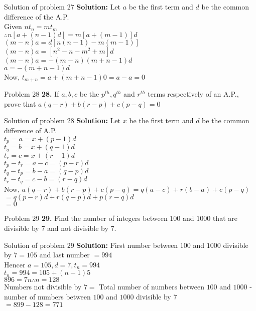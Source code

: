 \documentclass[aspectratio=1610,8pt]{beamer}
\begin{document}
\begin{frame}{Solution of problem 27}
  \textbf{Solution:} Let $a$ be the first term and $d$ be the common difference of the A.P.\\
  Given $nt_n = mt_m$\\
  $\therefore n[a + (n - 1)d] = m[a + (m - 1)]d$\\
  $(m - n)a = d[n(n - 1) - m(m - 1)]$\\
  $(m - n)a = [n^2 - n - m^2 + m]d$\\
  $(m - n)a = -(m - n)(m + n - 1)d$\\
  $a = -(m + n - 1)d$\\
  Now, $t_{m + n} = a + (m + n - 1)0 = a - a = 0$
\end{frame}
\begin{frame}{Problem 28}
  \textbf{28.} If $a, b, c$ be the $p^{th}, q^{th}$ and $r^{th}$ terms respectively of an
  A.P., prove that $a(q - r) + b(r - p) + c(p - q) = 0$
\end{frame}
\begin{frame}{Solution of problem 28}
  \textbf{Solution:} Let $x$ be the first term and $d$ be the common difference
  of A.P.\\
  $t_p = a = x + (p - 1)d$\\
  $t_q = b = x + (q - 1)d$\\
  $t_r = c = x + (r - 1)d$\\
  $t_p - t_r = a - c = (p - r)d$\\
  $t_q - t_p = b - a = (q - p)d$\\
  $t_r - t_q = c - b = (r - q)d$\\
  Now, $a(q - r) + b(r - p) + c(p - q) = q(a - c) + r(b - a) + c(p - q)$\\
  $= q(p - r)d + r(q - p)d + p(r - q)d$\\
  $= 0$
\end{frame}
\begin{frame}{Problem 29}
  \textbf{29.} Find the number of integers between $100$ and $1000$ that are
  divisible by $7$ and not divisible by $7.$
\end{frame}
\begin{frame}{Solution of problem 29}
  \textbf{Solution:} First number between $100$ and $1000$ divisible by $7 =
  105$ and last number $= 994$\\
  Hencer $a = 105, d = 7, t_n = 994$\\
  $t_n = 994 = 105 + (n - 1)5$\\
  $896 = 7n \therefore n = 128$\\
  Numbers not divisible by $7 = $ Total number of numbers between $100$ and
  $1000$ - number of numbers between $100$ and $1000$ divisible by $7$\\
  $= 899 - 128 = 771$
\end{frame}
\end{document}
